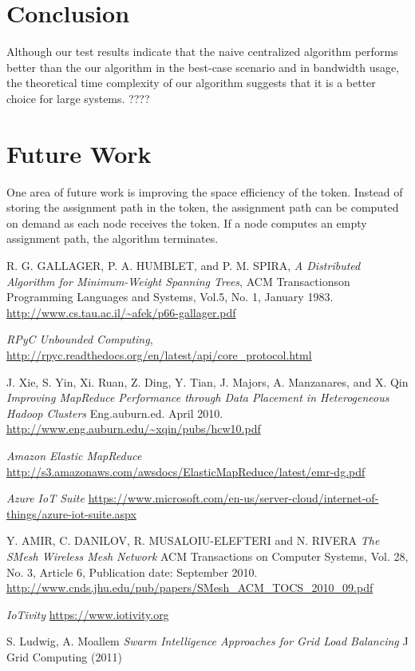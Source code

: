 \documentclass[11pt]{article}
\begin{document}
\begin{multicols}{2}
\section{Conclusion}
Although our test results indicate that the naive centralized algorithm performs better than the our algorithm in the best-case scenario and in bandwidth usage, the theoretical time complexity of our algorithm suggests that it is a better choice for large systems. ????

\section{Future Work}
One area of future work is improving the space efficiency of the token. Instead of storing the assignment path in the token, the assignment path can be computed on demand as each node receives the token. If a node computes an empty assignment path, the algorithm terminates.

\end{multicols}
\begin{thebibliography}{9}

  R. G. GALLAGER, P. A. HUMBLET, and P. M. SPIRA,
  \emph{A Distributed Algorithm for Minimum-Weight Spanning Trees},
  ACM Transactionson Programming Languages and Systems, Vol.5, No. 1, January 1983.
  \url{http://www.cs.tau.ac.il/~afek/p66-gallager.pdf}
  
  \emph{RPyC Unbounded Computing},
  \url{http://rpyc.readthedocs.org/en/latest/api/core_protocol.html}
  
  J. Xie, S. Yin, Xi. Ruan, Z. Ding, Y. Tian, J. Majors, A. Manzanares, and X. Qin
  \emph{Improving MapReduce Performance through Data Placement in Heterogeneous Hadoop Clusters}
   Eng.auburn.ed. April 2010.
  \url{http://www.eng.auburn.edu/~xqin/pubs/hcw10.pdf}
  
  \emph{Amazon Elastic MapReduce}
  \url{http://s3.amazonaws.com/awsdocs/ElasticMapReduce/latest/emr-dg.pdf}
  
  \emph{Azure IoT Suite}
  \url{https://www.microsoft.com/en-us/server-cloud/internet-of-things/azure-iot-suite.aspx}

  Y. AMIR, C. DANILOV, R. MUSALOIU-ELEFTERI and N. RIVERA
  \emph{The SMesh Wireless Mesh Network}
  ACM Transactions on Computer Systems, Vol. 28, No. 3, Article 6, Publication date: September 2010.
  \url{http://www.cnds.jhu.edu/pub/papers/SMesh_ACM_TOCS_2010_09.pdf}
  
  \emph{IoTivity}
  \url{https://www.iotivity.org}
  
  S. Ludwig, A. Moallem
  \emph{Swarm Intelligence Approaches for Grid Load Balancing}
  J Grid Computing (2011)
  
\end{thebibliography}
\end{document}
